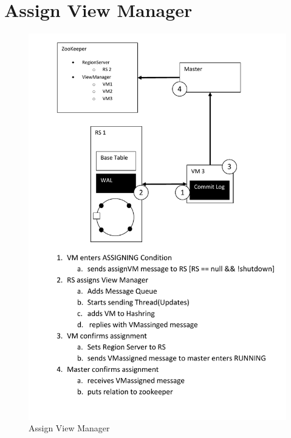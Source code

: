 \section{Assign View Manager}
\begin{figure}[h!]
  \centering
    \includegraphics[scale=0.8]{figures/SO_AssignViewManager}
     \caption{Assign View Manager}
    \label{fig:assignviewmanager}
\end{figure}
\newpage

